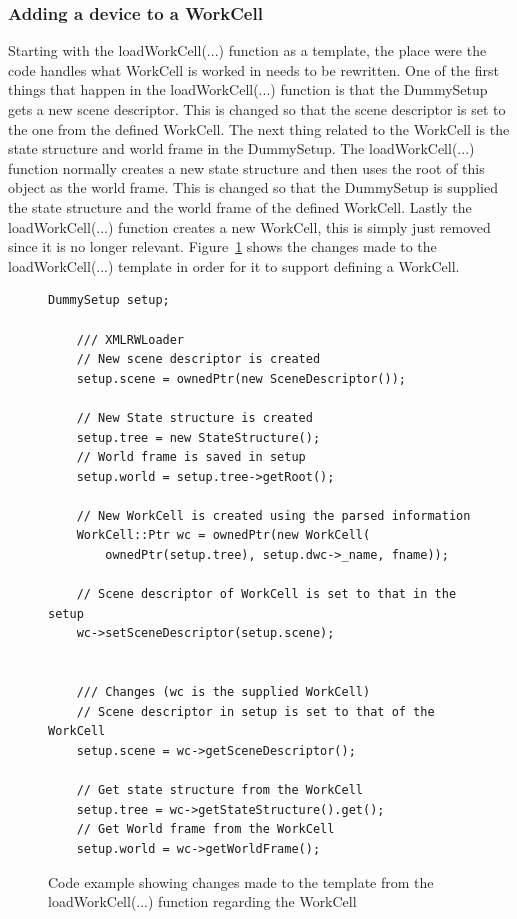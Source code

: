 \subsubsection{Adding a device to a WorkCell}
Starting with the loadWorkCell(...) function as a template, the place were the code handles what WorkCell is worked in needs to be rewritten. One of the first things that happen in the loadWorkCell(...) function is that the DummySetup gets a new scene descriptor. This is changed so that the scene descriptor is set to the one from the defined WorkCell. The next thing related to the WorkCell is the state structure and world frame in the DummySetup. The loadWorkCell(...) function normally creates a new state structure and then uses the root of this object as the world frame. This is changed so that the DummySetup is supplied the state structure and the world frame of the defined WorkCell. Lastly the loadWorkCell(...) function creates a new WorkCell, this is simply just removed since it is no longer relevant. Figure~\ref{fig:ChangedInLoaderWorkCell} shows the changes made to the loadWorkCell(...) template in order for it to support defining a WorkCell.

\begin{figure}[h]
	\centering
	\lstset{language=C++} 
	\begin{lstlisting}[frame=single]
	DummySetup setup;
	
	/// XMLRWLoader
	// New scene descriptor is created
	setup.scene = ownedPtr(new SceneDescriptor());
	
	// New State structure is created
	setup.tree = new StateStructure();
	// World frame is saved in setup
	setup.world = setup.tree->getRoot();
	
	// New WorkCell is created using the parsed information
	WorkCell::Ptr wc = ownedPtr(new WorkCell(
		ownedPtr(setup.tree), setup.dwc->_name, fname));
		
	// Scene descriptor of WorkCell is set to that in the setup
	wc->setSceneDescriptor(setup.scene);
	
	
	/// Changes	(wc is the supplied WorkCell)
	// Scene descriptor in setup is set to that of the WorkCell
	setup.scene = wc->getSceneDescriptor();
	
	// Get state structure from the WorkCell
	setup.tree = wc->getStateStructure().get();
	// Get World frame from the WorkCell
	setup.world = wc->getWorldFrame();
	\end{lstlisting}
	\caption{Code example showing changes made to the template from the loadWorkCell(...) function regarding the WorkCell}
	\label{fig:ChangedInLoaderWorkCell}
\end{figure}

